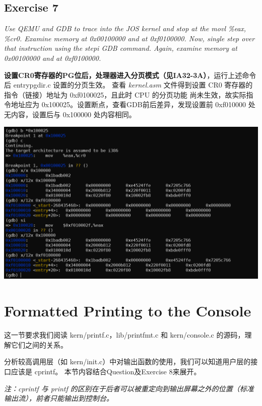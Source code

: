 \documentclass[12pt, letterpaper]{report}
\begin{document}
\subsection{\large Exercise 7}
\textsl{Use QEMU and GDB to trace into the JOS kernel and stop at the movl \%eax, \%cr0. 
        Examine memory at 0x00100000 and at 0xf0100000. Now, single step over that instruction 
        using the stepi GDB command. Again, examine memory at 0x00100000 and at 0xf0100000.} \par 
\quad \par
\textbf{设置CR0寄存器的PG位后，处理器进入分页模式（见IA32-3A）}，运行上述命令后 entrypgdir.c 设置的分页生效。
查看 \textsl{kernel.asm} 文件得到设置 CR0 寄存器的指令（链接）地址为 0xf0100025，且此时 CPU 的分页功能
尚未生效，故实际指令地址应为 0x100025。设置断点，查看GDB前后差异，发现设置前 0xf010000 处无内容，设置后与 0x100000 
处内容相同。 \par
\quad \par
\includegraphics[width=\textwidth]{entrypgdir_start} \par

\section[\large Formatted Printing to the Console]{Formatted Printing to the Console}
这一节要求我们阅读 kern/printf.c，lib/printfmt.c 和 kern/console.c 的源码，理解它们之间的关系。\par 
分析较高调用层（如 kern/init.c）中对输出函数的使用，我们可以知道用户层的接口应该是 cprintf。
本节内容结合Question及Exercise 8来展开。\par
\textsl{注：cprintf 与 printf 的区别在于后者可以被重定向到输出屏幕之外的位置（标准输出流），前者只能输出到控制台。} \par 
\end{document}
